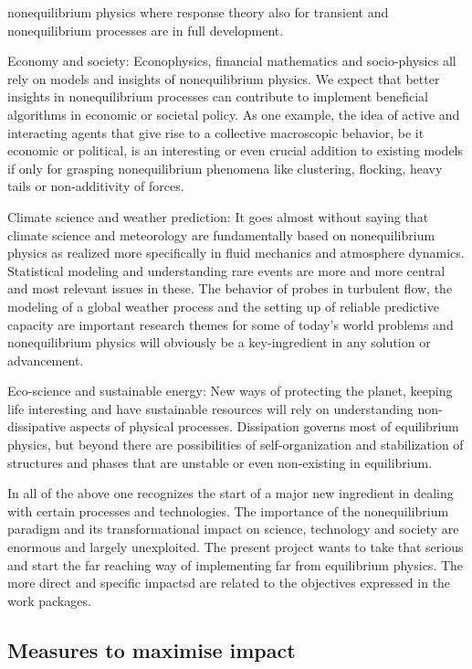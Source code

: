 \begin{compactitem}
  nonequilibrium physics where response theory also for transient and nonequilibrium
  processes are in full development.
\item Economy and society: Econophysics, financial mathematics and socio-physics all rely on
  models and insights of nonequilibrium physics. We expect that better insights in
  nonequilibrium processes can contribute to implement beneficial algorithms in economic or
  societal policy.  As one example, the idea of active and interacting agents that give rise
  to a collective macroscopic behavior, be it economic or political, is an interesting or
  even crucial addition to existing models if only for grasping nonequilibrium phenomena
  like clustering, flocking, heavy tails or non-additivity of forces.
\item Climate science and weather prediction: It goes almost without saying that climate
  science and meteorology are fundamentally based on nonequilibrium physics as realized more
  specifically in fluid mechanics and atmosphere dynamics. Statistical modeling and
  understanding rare events are more and more central and most relevant issues in these. The
  behavior of probes in turbulent flow, the modeling of a global weather process and the
  setting up of reliable predictive capacity are important research themes for some of
  today's world problems and nonequilibrium physics will obviously be a key-ingredient in
  any solution or advancement.
\item Eco-science and sustainable energy: New ways of protecting the planet, keeping life
  interesting and have sustainable resources will rely on understanding non-dissipative
  aspects of physical processes.  Dissipation governs most of equilibrium physics, but
  beyond there are possibilities of self-organization and stabilization of structures and
  phases that are unstable or even non-existing in equilibrium.
\end{compactitem}
In all of the above one recognizes the start of a major new ingredient in dealing with
certain processes and technologies. The importance of the nonequilibrium paradigm and its
transformational impact on science, technology and society are enormous and largely
unexploited. The present project wants to take that serious and start the far reaching way
of implementing far from equilibrium physics. The more direct and specific impactsd are related to the objectives expressed in the work packages.

\subsection{Measures to maximise impact}

